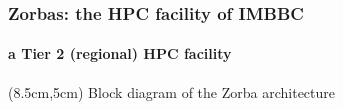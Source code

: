 \documentclass{beamer}
\begin{document}
   \begin{frame}
   
      \frametitle{Zorbas: the HPC facility of IMBBC}
      \framesubtitle{a Tier 2 (regional) HPC facility}
      

      \begin{textblock*}{3.5cm}(8.5cm,5cm)
         Block diagram of the Zorba architecture
      \end{textblock*}
   
   \end{frame}
\end{document}
